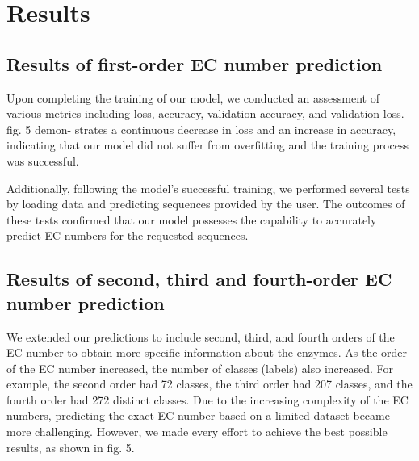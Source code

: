 \documentclass[conference]{IEEEtran}
\begin{document}
\section{Results}

\subsection{Results of first-order EC number prediction}

Upon completing the training of our model, we conducted an assessment of various
metrics including loss, accuracy, validation accuracy, and validation loss. fig. 5 demon-
strates a continuous decrease in loss and an increase in accuracy, indicating that our
model did not suffer from overfitting and the training process was successful.

Additionally, following the model’s successful training, we performed several tests by
loading data and predicting sequences provided by the user. The outcomes of these tests
confirmed that our model possesses the capability to accurately predict EC numbers for
the requested sequences.

\subsection{Results of second, third and fourth-order EC number prediction}

We extended our predictions to include second, third, and fourth orders of the EC number
to obtain more specific information about the enzymes. As the order of the EC number
increased, the number of classes (labels) also increased. For example, the second order
had 72 classes, the third order had 207 classes, and the fourth order had 272 distinct
classes. Due to the increasing complexity of the EC numbers, predicting the exact EC
number based on a limited dataset became more challenging. However, we made every
effort to achieve the best possible results, as shown in fig. 5.
\end{document}
